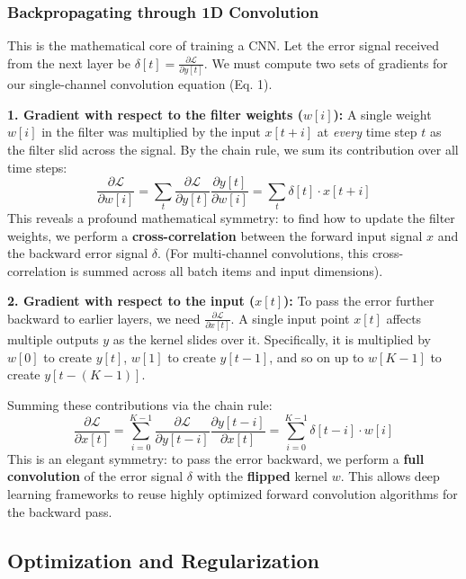 \subsubsection{Backpropagating through 1D Convolution}
This is the mathematical core of training a CNN. Let the error signal received from the next layer be $\delta[t] = \frac{\partial \mathcal{L}}{\partial y[t]}$. We must compute two sets of gradients for our single-channel convolution equation (Eq. 1).

\textbf{1. Gradient with respect to the filter weights ($w[i]$):}
A single weight $w[i]$ in the filter was multiplied by the input $x[t+i]$ at \textit{every} time step $t$ as the filter slid across the signal. By the chain rule, we sum its contribution over all time steps:
\begin{equation}
    \frac{\partial \mathcal{L}}{\partial w[i]} = \sum_t \frac{\partial \mathcal{L}}{\partial y[t]} \frac{\partial y[t]}{\partial w[i]} = \sum_t \delta[t] \cdot x[t+i]
\end{equation}
This reveals a profound mathematical symmetry: to find how to update the filter weights, we perform a \textbf{cross-correlation} between the forward input signal $x$ and the backward error signal $\delta$. (For multi-channel convolutions, this cross-correlation is summed across all batch items and input dimensions).

\textbf{2. Gradient with respect to the input ($x[t]$):}
To pass the error further backward to earlier layers, we need $\frac{\partial \mathcal{L}}{\partial x[t]}$. A single input point $x[t]$ affects multiple outputs $y$ as the kernel slides over it. Specifically, it is multiplied by $w[0]$ to create $y[t]$, $w[1]$ to create $y[t-1]$, and so on up to $w[K-1]$ to create $y[t-(K-1)]$.

Summing these contributions via the chain rule:
\begin{equation}
    \frac{\partial \mathcal{L}}{\partial x[t]} = \sum_{i=0}^{K-1} \frac{\partial \mathcal{L}}{\partial y[t-i]} \frac{\partial y[t-i]}{\partial x[t]} = \sum_{i=0}^{K-1} \delta[t-i] \cdot w[i]
\end{equation}
This is an elegant symmetry: to pass the error backward, we perform a \textbf{full convolution} of the error signal $\delta$ with the \textbf{flipped} kernel $w$. This allows deep learning frameworks to reuse highly optimized forward convolution algorithms for the backward pass.

\subsection{Optimization and Regularization}
